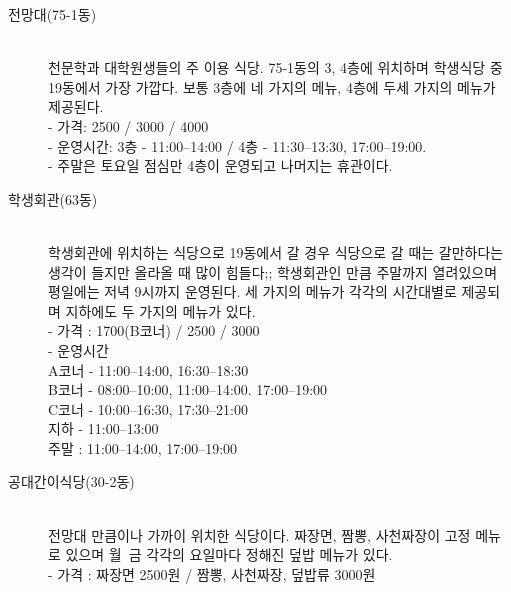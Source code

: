 \begin{description}
\item[\textsf{전망대(75-1동)}] \hfill \\
  천문학과 대학원생들의 주 이용 식당. 75-1동의 3, 4층에 위치하며 학생식당 중 19동에서 가장 가깝다. 보통 3층에 네 가지의 메뉴, 4층에 두세 가지의 메뉴가 제공된다.\\
  \hspace*{0.5cm}- 가격: 2500 / 3000 / 4000\\
  \hspace*{0.5cm}- 운영시간: 3층 - 11:00--14:00 / 4층 - 11:30--13:30, 17:00--19:00.\\
  \hspace*{0.5cm}- 주말은 토요일 점심만 4층이 운영되고 나머지는 휴관이다.\\

\item[\textsf{학생회관(63동)}] \hfill \\
  학생회관에 위치하는 식당으로 19동에서 갈 경우 식당으로 갈 때는 갈만하다는 생각이 들지만 올라올 때 많이 힘들다;; 학생회관인 만큼 주말까지 열려있으며 평일에는 저녁 9시까지 운영된다. 세 가지의 메뉴가 각각의 시간대별로 제공되며 지하에도 두 가지의 메뉴가 있다.\\
  \hspace*{0.5cm}- 가격 : 1700(B코너) / 2500 / 3000 \\
  \hspace*{0.5cm}- 운영시간 \hfill\\
  \hspace*{1cm} A코너 - 11:00--14:00, 16:30--18:30\\
  \hspace*{1cm} B코너 - 08:00--10:00, 11:00--14:00. 17:00--19:00\\
  \hspace*{1cm} C코너 - 10:00--16:30, 17:30--21:00\\
  \hspace*{1cm} 지하 - 11:00--13:00\\
  \hspace*{1cm} 주말 : 11:00--14:00, 17:00--19:00\\

\item[\textsf{공대간이식당(30-2동)}] \hfill \\
  전망대 만큼이나 가까이 위치한 식당이다. 짜장면, 짬뽕, 사천짜장이 고정 메뉴로 있으며 월~금 각각의 요일마다 정해진 덮밥 메뉴가 있다.\\
  \hspace*{0.5cm} - 가격 : 짜장면 2500원 / 짬뽕, 사천짜장, 덮밥류 3000원


\end{description}
